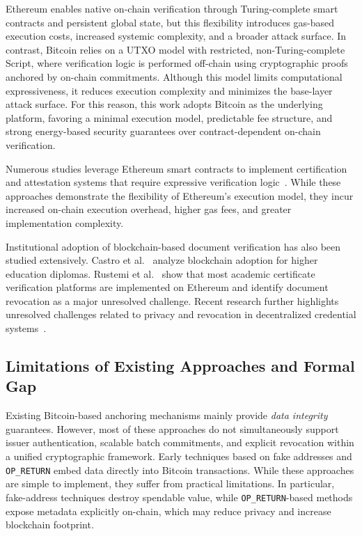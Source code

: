 \documentclass[preprint,12pt]{elsarticle}
\begin{document}


Ethereum enables native on-chain verification through Turing-complete smart contracts and persistent global state, but this flexibility introduces gas-based execution costs, increased systemic complexity, and a broader attack surface. In contrast, Bitcoin relies on a UTXO model with restricted, non-Turing-complete Script, where verification logic is performed off-chain using cryptographic proofs anchored by on-chain commitments. 
Although this model limits computational expressiveness, it reduces execution complexity and minimizes the base-layer attack surface. 
For this reason, this work adopts Bitcoin as the underlying platform, favoring a minimal execution model, predictable fee structure, and strong energy-based security guarantees over contract-dependent on-chain verification.

Numerous studies leverage Ethereum smart contracts to implement certification and attestation systems that require expressive verification logic~\cite{Wang2019BlockchainCT,Li2020DecentralizedPKI,Pennino2021EfficientCertification,Palmisano2022NotarizationAntiPlagiarism,Mishra2025BlockchainDecentralized,Harer2022DecentralizedAttestation}.
While these approaches demonstrate the flexibility of Ethereum’s execution model, they incur increased on-chain execution overhead, higher gas fees, and greater implementation complexity.

Institutional adoption of blockchain-based document verification has also been studied extensively. Castro et al.~\cite{Castro2021BlockchainHigherEducation} analyze blockchain adoption for higher education diplomas.
Rustemi et al.~\cite{Rustemi2023SLRBlockchainCertificates} show that most academic certificate verification platforms are implemented on Ethereum and identify document revocation as a major unresolved challenge.
Recent research further highlights unresolved challenges related to privacy and revocation in decentralized credential systems~\cite{Ramica2024SelectiveDisclosure,Zhang2025PrivacyProtectionIssuanceRevocationVerifiableCredentials}.

\subsection{Limitations of Existing Approaches and Formal Gap}
\label{sec:formal_gap}

Existing Bitcoin-based anchoring mechanisms mainly provide \emph{data integrity} guarantees. However, most of these approaches do not simultaneously support issuer authentication, scalable batch commitments, and explicit revocation within a unified cryptographic framework. Early techniques based on fake addresses and \texttt{OP\_RETURN} embed data directly into Bitcoin transactions. While these approaches are simple to implement, they suffer from practical limitations. In particular, fake-address techniques destroy spendable value, while \texttt{OP\_RETURN}-based methods expose metadata explicitly on-chain, which may reduce privacy and increase blockchain footprint.
\end{document}
